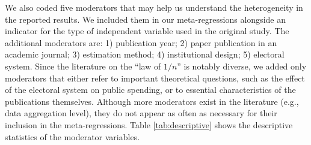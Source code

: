 \documentclass[11pt,a4paper,]{article}
\begin{document}
We also coded five moderators that may help us understand the
heterogeneity in the reported results. We included them in our
meta-regressions alongside an indicator for the type of independent
variable used in the original study. The additional moderators are: 1)
publication year; 2) paper publication in an academic journal; 3)
estimation method; 4) institutional design; 5) electoral system. Since
the literature on the ``law of \(1/n\)'' is notably diverse, we added
only moderators that either refer to important theoretical questions,
such as the effect of the electoral system on public spending, or to
essential characteristics of the publications themselves. Although more
moderators exist in the literature (e.g., data aggregation level), they
do not appear as often as necessary for their inclusion in the
meta-regressions. Table \ref{tab:descriptive} shows the descriptive
statistics of the moderator variables.

\vspace{.5cm}

\footnotesize
\end{document}
